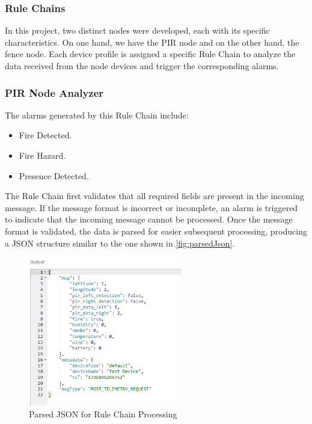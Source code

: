 \subsubsection*{Rule Chains}
In this project, two distinct nodes were developed, each with its specific characteristics. On one hand, we have the PIR node and on the other hand, the fence node. 
Each device profile is assigned a specific Rule Chain to analyze the data received from the node devices and trigger the corresponding alarms.


\subsubsection*{PIR Node Analyzer}
The alarms generated by this Rule Chain include:
\begin{itemize}
    \item Fire Detected.
    \item Fire Hazard.
    \item Presence Detected.
\end{itemize}

The Rule Chain first validates that all required fields are present in the incoming message. If the message format is incorrect or incomplete, an alarm is triggered 
to indicate that the incoming message cannot be processed. Once the message format is validated, the data is parsed for easier subsequent processing, producing a JSON
structure similar to the one shown in \autoref{fig:parsedJson}.

\begin{figure}[H]
    \centering
    \includegraphics[width=0.6\textwidth]{./images/8/jsonParsed.PNG}
    \caption{Parsed JSON for Rule Chain Processing}
    \label{fig:parsedJson}
\end{figure}

